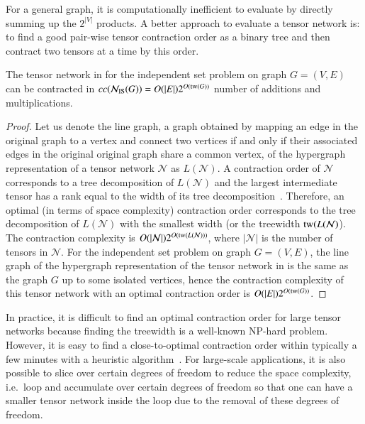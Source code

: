 \documentclass[review, onefignum, onetabnum]{siamart190516}
\begin{document}
For a general graph, it is computationally inefficient to evaluate  by directly summing up the $2^{|V|}$ products.
A better approach to evaluate a tensor network is: to find a good pair-wise tensor contraction order as a binary tree and then contract two tensors at a time by this order.
\begin{theorem}\label{thm:complexreal}
    The tensor network in  for the independent set problem on graph $G = (V,E)$ can be contracted in $cc({\mathcal{N}_{\rm IS}(G)}) = O(|E|)2^{O({\rm tw}(G))}$ number of additions and multiplications.
\end{theorem}
\begin{proof}
Let us denote the line graph, a graph obtained by mapping an edge in the original graph to a vertex and connect two vertices if and only if their associated edges in the original original graph share a common vertex, of the hypergraph representation of a tensor network $\mathcal{N}$ as $L(\mathcal{N})$.
A contraction order of $\mathcal{N}$ corresponds to a tree decomposition of $L(\mathcal{N})$ and the largest intermediate tensor has a rank equal to the width of its tree decomposition~\cite{Markov2008}.
Therefore, an optimal (in terms of space complexity) contraction order corresponds to the tree decomposition of $L(\mathcal{N})$ with the smallest width (or the treewidth ${\rm tw}(L(\mathcal{N})$). The contraction complexity is $O(|\mathcal{N}|)2^{O({\rm tw}(L(\mathcal{N})))}$, where $|\mathcal{N}|$ is the number of tensors in $\mathcal{N}$.
For the independent set problem on graph $G = (V, E)$, the line graph of the hypergraph representation of the tensor network in  is the same as the graph $G$ up to some isolated vertices, hence the contraction complexity of this tensor network with an optimal contraction order is $O(|E|)2^{O({\rm tw}(G))}$.
\end{proof}
 
In practice, it is difficult to find an optimal contraction order for large tensor networks because finding the treewidth is a well-known NP-hard problem.
However, it is easy to find a close-to-optimal contraction order within typically a few minutes with a heuristic algorithm~\cite{Kourtis2019, Kalachev2021}.
For large-scale applications, it is also possible to slice over certain degrees of freedom to reduce the space complexity, i.e.\
loop and accumulate over certain degrees of freedom so that one can have a smaller tensor network inside the loop due to the removal of these degrees of freedom.
\end{document}
